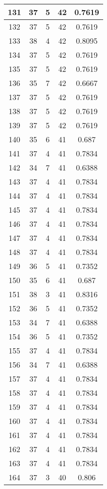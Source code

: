 \documentclass[letterpaper, 12pt]{article}
\begin{document}
\begin{longtable}{|c|c|c|c|c|}
\hline
131 & 37 & 5 & 42 & 0.7619 \\
\hline
132 & 37 & 5 & 42 & 0.7619 \\
\hline
133 & 38 & 4 & 42 & 0.8095 \\
\hline
134 & 37 & 5 & 42 & 0.7619 \\
\hline
135 & 37 & 5 & 42 & 0.7619 \\
\hline
136 & 35 & 7 & 42 & 0.6667 \\
\hline
137 & 37 & 5 & 42 & 0.7619 \\
\hline
138 & 37 & 5 & 42 & 0.7619 \\
\hline
139 & 37 & 5 & 42 & 0.7619 \\
\hline
140 & 35 & 6 & 41 & 0.687 \\
\hline
141 & 37 & 4 & 41 & 0.7834 \\
\hline
142 & 34 & 7 & 41 & 0.6388 \\
\hline
143 & 37 & 4 & 41 & 0.7834 \\
\hline
144 & 37 & 4 & 41 & 0.7834 \\
\hline
145 & 37 & 4 & 41 & 0.7834 \\
\hline
146 & 37 & 4 & 41 & 0.7834 \\
\hline
147 & 37 & 4 & 41 & 0.7834 \\
\hline
148 & 37 & 4 & 41 & 0.7834 \\
\hline
149 & 36 & 5 & 41 & 0.7352 \\
\hline
150 & 35 & 6 & 41 & 0.687 \\
\hline
151 & 38 & 3 & 41 & 0.8316 \\
\hline
152 & 36 & 5 & 41 & 0.7352 \\
\hline
153 & 34 & 7 & 41 & 0.6388 \\
\hline
154 & 36 & 5 & 41 & 0.7352 \\
\hline
155 & 37 & 4 & 41 & 0.7834 \\
\hline
156 & 34 & 7 & 41 & 0.6388 \\
\hline
157 & 37 & 4 & 41 & 0.7834 \\
\hline
158 & 37 & 4 & 41 & 0.7834 \\
\hline
159 & 37 & 4 & 41 & 0.7834 \\
\hline
160 & 37 & 4 & 41 & 0.7834 \\
\hline
161 & 37 & 4 & 41 & 0.7834 \\
\hline
162 & 37 & 4 & 41 & 0.7834 \\
\hline
163 & 37 & 4 & 41 & 0.7834 \\
\hline
164 & 37 & 3 & 40 & 0.806 \\

\end{longtable}
\end{document}
